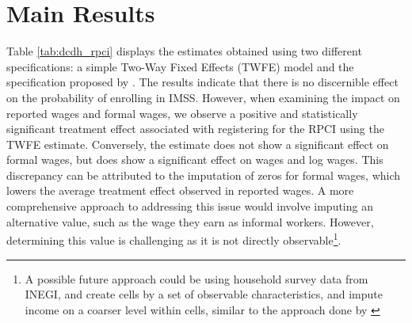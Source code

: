 \documentclass[10pt, oneside]{book}
\begin{document}
\section{Main Results}

Table \ref{tab:dcdh_rpci} displays the estimates obtained using two different specifications: a simple Two-Way Fixed Effects (TWFE) model and the specification proposed by \cite{de2020two}. The results indicate that there is no discernible effect on the probability of enrolling in IMSS. However, when examining the impact on reported wages and formal wages, we observe a positive and statistically significant treatment effect associated with registering for the RPCI using the TWFE estimate. Conversely, the \cite{de2020two} estimate does not show a significant effect on formal wages, but does show a significant effect on wages and log wages. This discrepancy can be attributed to the imputation of zeros for formal wages, which lowers the average treatment effect observed in reported wages. A more comprehensive approach to addressing this issue would involve imputing an alternative value, such as the wage they earn as informal workers. However, determining this value is challenging as it is not directly observable\footnote{A possible future approach could be using household survey data from INEGI, and create cells by a set of observable characteristics, and impute income on a coarser level within cells, similar to the approach done by \cite{kumler2020enlisting}}. \\
\end{document}
